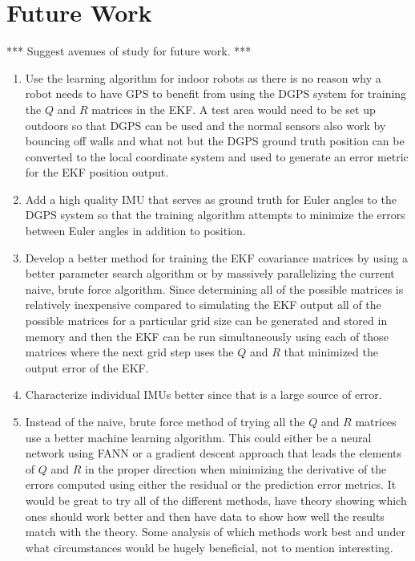 \chapter{Future Work}
\label{ch:futurework}
*** Suggest avenues of study for future work. ***

\begin{enumerate}
\item Use the learning algorithm for indoor robots as there is no reason why a robot needs to have GPS to benefit from using the DGPS system for training the $Q$ and $R$ matrices in the EKF. A test area would need to be set up outdoors so that DGPS can be used and the normal sensors also work by bouncing off walls and what not but the DGPS ground truth position can be converted to the local coordinate system and used to generate an error metric for the EKF position output.
\item Add a high quality IMU that serves as ground truth for Euler angles to the DGPS system so that the training algorithm attempts to minimize the errors between Euler angles in addition to position.
\item Develop a better method for training the EKF covariance matrices by using a better parameter search algorithm or by massively parallelizing the current naive, brute force algorithm. Since determining all of the possible matrices is relatively inexpensive compared to simulating the EKF output all of the possible matrices for a particular grid size can be generated and stored in memory and then the EKF can be run simultaneously using each of those matrices where the next grid step uses the $Q$ and $R$ that minimized the output error of the EKF.
\item Characterize individual IMUs better since that is a large source of error.
\item Instead of the naive, brute force method of trying all the $Q$ and $R$ matrices use a better machine learning algorithm. This could either be a neural network using FANN or a gradient descent approach that leads the elements of $Q$ and $R$ in the proper direction when minimizing the derivative of the errors computed using either the residual or the prediction error metrics. It would be great to try all of the different methods, have theory showing which ones should work better and then have data to show how well the results match with the theory. Some analysis of which methods work best and under what circumstances would be hugely beneficial, not to mention interesting.
\end{enumerate}
